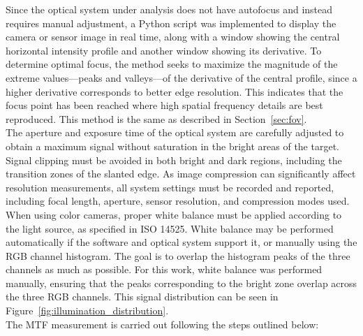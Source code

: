 Since the optical system under analysis does not have autofocus and instead requires manual adjustment, a Python script was implemented to display the camera or sensor image in real time, along with a window showing the central horizontal intensity profile and another window showing its derivative. To determine optimal focus, the method seeks to maximize the magnitude of the extreme values—peaks and valleys—of the derivative of the central profile, since a higher derivative corresponds to better edge resolution. This indicates that the focus point has been reached where high spatial frequency details are best reproduced. This method is the same as described in Section~\ref{sec:fov}.\\

The aperture and exposure time of the optical system are carefully adjusted to obtain a maximum signal without saturation in the bright areas of the target. Signal clipping must be avoided in both bright and dark regions, including the transition zones of the slanted edge. As image compression can significantly affect resolution measurements, all system settings must be recorded and reported, including focal length, aperture, sensor resolution, and compression modes used. When using color cameras, proper white balance must be applied according to the light source, as specified in ISO 14525. White balance may be performed automatically if the software and optical system support it, or manually using the RGB channel histogram. The goal is to overlap the histogram peaks of the three channels as much as possible. For this work, white balance was performed manually, ensuring that the peaks corresponding to the bright zone overlap across the three RGB channels. This signal distribution can be seen in Figure~\ref{fig:illumination_distribution}.\\

The MTF measurement is carried out following the steps outlined below:

